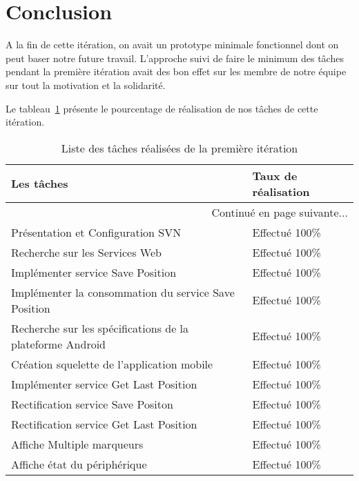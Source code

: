 \section*{Conclusion}

A la fin de cette itération, on avait un prototype minimale fonctionnel
dont on peut baser notre future travail.
L'approche suivi de faire le minimum des tâches pendant la première itération
avait des bon effet sur les membre de notre équipe sur tout la motivation et
la solidarité.

Le tableau~\ref{tab:sprint1-evaluation} présente le pourcentage de
réalisation de nos tâches de cette itération.

\begin{center}
    \begin{longtable}{| l | l |}
        \caption{Liste des tâches réalisées de la première itération}
\label{tab:sprint1-evaluation} \\

        \hline
        \textbf{Les tâches} & \textbf{Taux de réalisation} \\ \hline
        \endhead

        \hline \multicolumn{2}{|r|}{{Continué en page suivante$\dotsc$}} \\ \hline
        \endfoot

        \hline \hline
        \endlastfoot

        \hline
Présentation et Configuration SVN & Effectué 100\% \\ \hline
Recherche sur les Services Web & Effectué 100\% \\ \hline
Implémenter service Save Position & Effectué 100\% \\ \hline
Implémenter la consommation du service Save Position & Effectué 100\% \\ \hline
Recherche sur les spécifications de la plateforme Android & Effectué 100\% \\ \hline
Création squelette de l'application mobile & Effectué 100\% \\ \hline
Implémenter service Get Last Position & Effectué 100\% \\ \hline
Rectification service Save Positon & Effectué 100\% \\ \hline
Rectification service Get Last Position & Effectué 100\% \\ \hline
Affiche Multiple marqueurs & Effectué 100\% \\ \hline
Affiche état du périphérique & Effectué 100\% \\ \hline
    \end{longtable}
\end{center}
